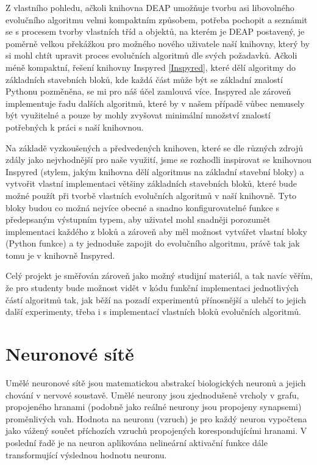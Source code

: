 Z vlastního pohledu, ačkoli knihovna DEAP umožňuje tvorbu asi
libovolného evolučního algoritmu velmi kompaktním způsobem, potřeba pochopit a
seznámit se s procesem tvorby vlastních tříd a objektů, na kterém je DEAP
postavený, je poměrně velkou překážkou pro možného nového uživatele naší
knihovny, který by si mohl chtít upravit proces evolučních algoritmů dle
svých požadavků. Ačkoli méně kompaktní, řešení knihovny Inspyred
\ref{Inspyred}, které dělí algoritmy do základních stavebních bloků, kde každá
část může být se základní znalostí Pythonu pozměněna, se mi pro náš účel
zamlouvá více. Inspyred ale zároveň implementuje řadu dalších algoritmů, které
by v našem případě vůbec nemusely být využitelné a pouze by mohly zvyšovat
minimální množství znalostí potřebných k práci s naší knihovnou.

Na základě vyzkoušených a předvedených knihoven, které se dle různých zdrojů
\citep{fortin2012deap} zdály jako nejvhodnější pro naše využití, jsme se
rozhodli inspirovat se knihovnou Inspyred (stylem, jakým knihovna dělí
algoritmus na základní stavební bloky) a vytvořit vlastní implementaci většiny
základních stavebních bloků, které bude možné použít při tvorbě vlastních
evolučních algoritmů v naší knihovně. Tyto bloky budou co možná nejvíce obecné
a snadno konfigurovatelné funkce s předepsaným výstupním typem, aby uživatel
mohl snadněji porozumět implementaci každého z bloků a zároveň aby měl možnost
vytvářet vlastní bloky (Python funkce) a ty jednoduše zapojit do evolučního
algoritmu, právě tak jak tomu je v knihovně Inspyred. 

Celý projekt je směřován zároveň jako možný studijní materiál, a tak navíc
věřím, že pro studenty bude možnost vidět v kódu funkční implementaci
jednotlivých částí algoritmů tak, jak běží na pozadí experimentů přínosnější a
ulehčí to jejich další experimenty, třeba i s implementací vlastních bloků
evolučních algoritmů.

\section{Neuronové sítě} \label{NN}
Umělé neuronové sítě jsou matematickou abstrakcí biologických neuronů a jejich
chování v nervové soustavě. Umělé neurony jsou zjednodušeně vrcholy v grafu,
propojeného hranami (podobně jako reálné neurony jsou propojeny synapsemi)
proměnlivých vah. Hodnota na neuronu (vzruch) je pro každý neuron vypočtena
jako vážený součet příchozích vzruchů propojených korespondujícími hranami. V
poslední řadě je na neuron aplikována nelineární aktivační funkce dále
transformující výslednou hodnotu neuronu.

